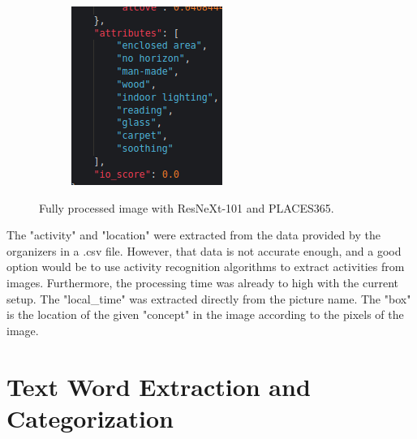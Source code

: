 \begin{figure}[H]
\begin{subfigure}{0.3\textwidth}
      \end{subfigure}
      \begin{subfigure}{0.3\textwidth}
        \includegraphics[width=\textwidth]{Sections/4InitialWork/4_images_random/res3.png}
        \end{subfigure}
      \caption{Fully processed image with ResNeXt-101 and PLACES365.}
      \label{fig:image_fully_processed_resnext}
      \end{figure}


      The "activity" and "location" were extracted from the data provided by the organizers in a .csv file. However,  that data is not accurate enough, and a good option would be to use activity recognition algorithms to extract activities from images. Furthermore, the processing time was already to high with the current setup.
      The "local\_time" was extracted directly from the picture name.
      The "box" is the location of the given "concept" in the image according to the pixels of the image.



\newpage
\section{Text Word Extraction and Categorization}
\label{sec:text}


